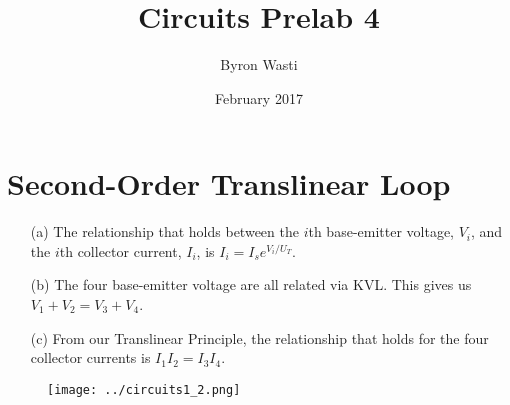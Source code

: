 \documentclass{article}
\title{Circuits Prelab 4}
\author{Byron Wasti}
\date{February 2017}
\begin{document}
\maketitle

\section{Second-Order Translinear Loop}
    \begin{itemize}
        \item [(a)]
            The relationship that holds between the $i$th base-emitter voltage, $V_i$, and the $i$th collector current, $I_i$, is $I_i = I_se^{V_i/U_T}$.

        \item [(b)]
            The four base-emitter voltage are all related via KVL. This gives us $V_1 + V_2 = V_3 + V_4$.

        \item [(c)]
            From our Translinear Principle, the relationship that holds for the four collector currents is $I_1I_2 = I_3I_4$.
        
    \end{itemize}

\begin{figure}[h]
    \centering
    \texttt{[image: ../circuits1\_2.png]}
    \caption{}
    \label{fig:1}
\end{figure}
\end{document}
